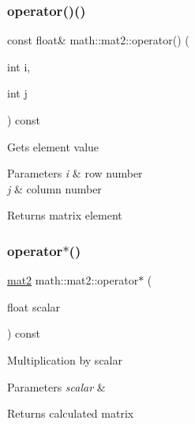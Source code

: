\subsubsection{\texorpdfstring{operator()()}{operator()()}\hspace{0.1cm}{\footnotesize\ttfamily [2/2]}}
{\footnotesize\ttfamily const float\& math\+::mat2\+::operator() (\begin{DoxyParamCaption}\item[{int}]{i,  }\item[{int}]{j }\end{DoxyParamCaption}) const\hspace{0.3cm}{\ttfamily [inline]}}

Gets element value 
\begin{DoxyParams}{Parameters}
{\em i} & row number \\
\hline
{\em j} & column number \\
\hline
\end{DoxyParams}
\begin{DoxyReturn}{Returns}
matrix element 
\end{DoxyReturn}
\mbox{\label{structmath_1_1mat2_a5971423e3b33e451df76e4a2a4e47e36}} 
\subsubsection{\texorpdfstring{operator$\ast$()}{operator*()}\hspace{0.1cm}{\footnotesize\ttfamily [1/2]}}
{\footnotesize\ttfamily \hyperlink{structmath_1_1mat2}{mat2} math\+::mat2\+::operator$\ast$ (\begin{DoxyParamCaption}\item[{float}]{scalar }\end{DoxyParamCaption}) const\hspace{0.3cm}{\ttfamily [inline]}}

Multiplication by scalar 
\begin{DoxyParams}{Parameters}
{\em scalar} & \\
\hline
\end{DoxyParams}
\begin{DoxyReturn}{Returns}
calculated matrix 
\end{DoxyReturn}
\mbox{\label{structmath_1_1mat2_a57bfc3f0f7fdaf172fc6a4fab4b16bf2}} 
